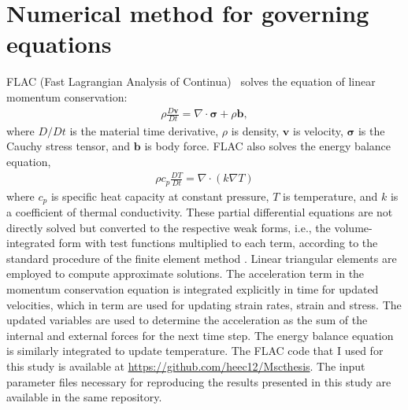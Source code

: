 \documentclass[letterpaper,12pt,notitle]{memphisthesis}                     %
\begin{document}
%
%
%
%

\section{Numerical method for governing equations}
FLAC (Fast Lagrangian Analysis of Continua)~\citep{Cundall1982, Poliakov1993, Lavier2002} solves the equation of linear momentum conservation:
\begin{align}
\rho \frac{D \mathbf{v}}{Dt} = \nabla \cdot \boldsymbol{\sigma} + \rho \mathbf{b},
\end{align}
where $D/Dt$ is the material time derivative, $\rho$ is density, $\mathbf{v}$ is velocity, $\boldsymbol{\sigma}$ is the Cauchy stress tensor, and $\mathbf{b}$ is body force. %
FLAC also solves the energy balance equation,
\begin{align}
\rho c_{p} \frac{D T}{D t} = \nabla \cdot ( k \nabla T)
\end{align}
where $c_{p}$ is specific heat capacity at constant pressure, $T$ is temperature, and $k$ is a coefficient of thermal conductivity. 
%
These partial differential equations are not directly solved but converted to the respective weak forms, i.e., the volume-integrated form with test functions multiplied to each term, according to the standard procedure of the finite element method \citep{Hughes2000}. Linear triangular elements are employed to compute approximate solutions. The acceleration term in the momentum conservation equation is integrated explicitly in time for updated velocities, which in term are used for updating strain rates, strain and stress. The updated variables are used to determine the acceleration as the sum of the internal and external forces for the next time step. The energy balance equation is similarly integrated to update temperature. The FLAC code that I used for this study is available at \url{https://github.com/heec12/Mscthesis}. The input parameter files necessary for reproducing the results presented in this study are available in the same repository.
\end{document}
